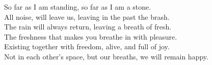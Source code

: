 So far as I am standing, so far as I am a stone.\\
All noise, will leave us, leaving in the past the brash.\\[8pt plus 2pt]

The rain will always return, leaving a breath of fresh.\\
The freshness that makes you breathe in with pleasure.\\[8pt plus 2pt]

Existing together with freedom, alive, and full of joy.\\
Not in each other’s space, but our breaths, we will remain happy.\\[8pt plus 2pt]


\egroup
